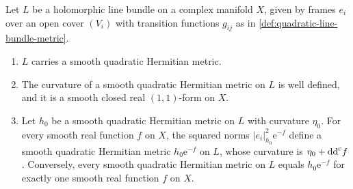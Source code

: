 \begin{lemma}\label{lem:smooth-line-bundle-metric-exists}
Let $L$ be a holomorphic line bundle on a complex manifold $X$, given by frames $e_i$ over an open cover $(V_i)$ with transition functions $g_{ij}$ as in \cref{def:quadratic-line-bundle-metric}.
\begin{enumerate}
\item $L$ carries a smooth quadratic Hermitian metric.
\item The curvature of a smooth quadratic Hermitian metric on $L$ is well defined, and it is a smooth closed real $(1,1)$-form on $X$.
\item Let $h_0$ be a smooth quadratic Hermitian metric on $L$ with curvature $\eta_0$. For every smooth real function $f$ on $X$, the squared norms $|e_i|_{h_0}^2\mathrm e^{-f}$ define a smooth quadratic Hermitian metric $h_0\mathrm e^{-f}$ on $L$, whose curvature is $\eta_0+\mathrm{dd}^{\mathrm{c}} f$. Conversely, every smooth quadratic Hermitian metric on $L$ equals $h_0\mathrm e^{-f}$ for exactly one smooth real function $f$ on $X$.
\end{enumerate}
\end{lemma}
